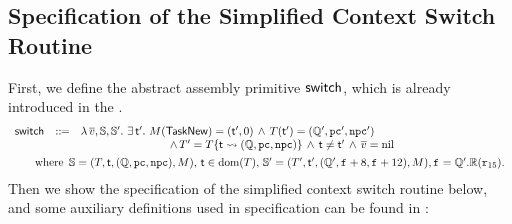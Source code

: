\subsection{Specification of the Simplified Context Switch Routine}

First, we define the abstract assembly primitive $\mathsf{switch}$, which is 
already introduced in the \Sec{\ref{subsec:High-level Pseudo-SPARCv8 Language}}. 
{
    \small
    $$
    \begin{array}{lcl}
        \primsw & \define & 
        \lambda \, \args{\val}, \hpstate, \hpstate'. \ 
        \exists \, \thrdid'. \ 
        \Mem(\TaskNew) = (\thrdid', 0) \, \land \, 
        \thrdpool(\thrdid') = 
            (\hRstate', \pc', \npc') \\ 
        & & \hspace*{8em} \land \, 
        \thrdpool' = \thrdpool\{ \thrdid \rightsquigarrow 
        (\hRstate, \pc, \npc) \}
        \, \land \, \thrdid \neq \thrdid'
        \, \land \, \args{\val} = \nil \\
        \\[-8pt] 
        \multicolumn{3}{l}
        {
        	\hspace*{1.8em}
            \text{where } \, 
            \hpstate = 
                (\thrdpool, \thrdid, (\hRstate, \pc, \npc), \Mem), \, 
            \tid \in \dom(\thrdpool), \,
            \hpstate' = 
            (\thrdpool', \thrdid', 
            	(\hRstate', \lab{} + 8, \lab{} + 12), \Mem), \lab{} = \hRstate'.\hRfile(\reg{15}). 
        }
    \end{array}
    $$
}
Then we show the specification of the simplified context switch routine below, and some auxiliary 
definitions used in specification can be found in \Fig{\ref{def:aux-def-spec}}: 
